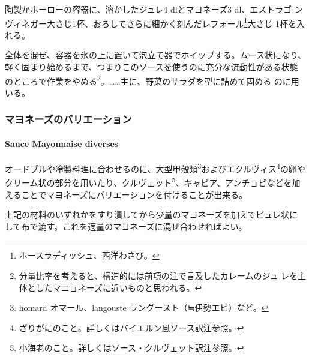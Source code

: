 \begin{recette}
陶製かホーローの容器に、溶かしたジュレ4 dlとマヨネーズ3 dl、エストラゴ
ンヴィネガー大さじ1杯、おろしてさらに細かく刻んだレフォール\footnote{ホースラディッシュ、西洋わさび。}大さじ
1杯を入れる。

全体を混ぜ、容器を氷の上に置いて泡立て器でホイップする。ムース状になり、
軽く固まり始めるまで、つまりこのソースを使うのに充分な流動性がある状態
のところで作業をやめる\footnote{分量比率を考えると、構造的には前項の注で言及したカレームのジュ
  レを主体としたマニョネーズに近いものと思われる。}。\ldots{}\ldots{}主に、野菜のサラダを型に詰めて固める
のに用いる。

\maeaki

\hypertarget{ux30deux30e8ux30cdux30fcux30baux306eux30d0ux30eaux30a8ux30fcux30b7ux30e7ux30f3}{%
\subsubsection{マヨネーズのバリエーション}\label{ux30deux30e8ux30cdux30fcux30baux306eux30d0ux30eaux30a8ux30fcux30b7ux30e7ux30f3}}

\hypertarget{mayonnaises-divierses}{%
\paragraph{Sauce Mayonnaise diverses}\label{mayonnaises-divierses}}


オードブルや冷製料理に合わせるのに、大型甲殻類\footnote{homard
  オマール、langouste ラングースト（≒伊勢エビ）など。}およびエクルヴィス\footnote{ざりがにのこと。詳しくは\protect\hyperlink{sauce-bavaroise}{バイエルン風ソース}訳注参照。}の卵や
クリーム状の部分を用いたり、クルヴェット\footnote{小海老のこと。詳しくは\protect\hyperlink{sauce-aux-crevettes}{ソース・クルヴェット}訳注参照。}、キャビア、アンチョビなどを加
えることでマヨネーズにバリエーションを付けることが出来る。

上記の材料のいずれかをすり潰してから少量のマヨネーズを加えてピュレ状に
して布で漉す。これを適量のマヨネーズに混ぜ合わせればよい。


\end{recette}
